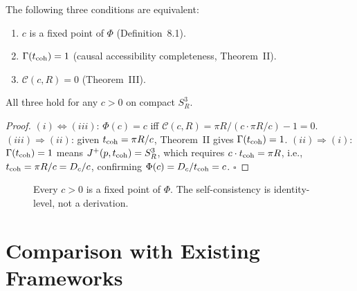\documentclass[12pt,a4paper]{article}
\theoremstyle{plain}
\theoremstyle{definition}
\theoremstyle{remark}
\begin{document}
\begin{tcolorbox}[thmbox={Theorem III$'$ — Extended Causal Self-Consistency}]
\label{thm:IIIp}
The following three conditions are equivalent:
\begin{enumerate}[label=\textup{(\roman*)},leftmargin=1.4em]
  \item $c$ is a fixed point of $\Phi$ (Definition~8.1).
  \item $\Gamma(t_{\rm coh}) = 1$ (causal accessibility completeness, Theorem~II).
  \item $\mathcal{C}(c,R) = 0$ (Theorem~III).
\end{enumerate}
All three hold for any $c > 0$ on compact $S^3_R$.
\end{tcolorbox}

\begin{proof}
$(i) \Leftrightarrow (iii)$: $\Phi(c) = c$ iff $\mathcal{C}(c,R) = \pi R/(c\cdot\pi R/c)-1 = 0$.
$(iii) \Rightarrow (ii)$: given $t_{\rm coh} = \pi R/c$, Theorem~II gives $\Gamma(t_{\rm coh}) = 1$.
$(ii) \Rightarrow (i)$: $\Gamma(t_{\rm coh}) = 1$ means $J^+(p,t_{\rm coh}) = S^3_R$,
which requires $c\cdot t_{\rm coh} = \pi R$, i.e., $t_{\rm coh} = \pi R/c = D_c/c$,
confirming $\Phi(c) = D_c/t_{\rm coh} = c$.
\hfill$\square$
\end{proof}

\begin{figure}[h!]
\centering
{}
\caption{Every $c>0$ is a fixed point of $\Phi$.
  The self-consistency is identity-level, not a derivation.}
\label{fig:phi}
\end{figure}

\section{Comparison with Existing Frameworks}
\label{sec:comparison}
\end{document}
